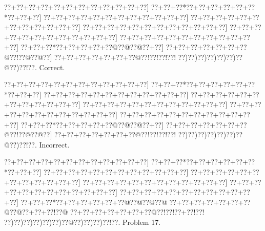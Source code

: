 \documentclass[a5paper]{article}
\begin{document}
\begin{center}
{\goo
\0??+\0??+\0??+\0??+\0??+\0??+\0??+\0??+\0??+\0??+\0??+\0??]
\0??+\0??+\0??*\0??+\0??+\0??+\0??+\0??+\0??*\0??+\0??+\0??]
\0??+\0??+\0??+\0??+\0??+\0??+\0??+\0??+\0??+\0??+\0??+\0??]
\0??+\0??+\0??+\0??+\0??+\0??+\0??+\0??+\0??+\0??+\0??+\0??]
\0??+\0??+\0??+\0??+\0??+\0??+\0??+\0??+\0??+\0??+\0??+\0??]
\0??+\0??+\0??+\0??+\0??+\0??+\0??+\0??+\0??+\0??+\0??+\0??]
\0??+\0??+\0??+\0??+\0??+\0??+\0??+\0??+\0??+\0??+\0??+\0??]
\0??+\0??+\0??*\0??+\0??+\0??+\0??+\0??@\0??@\0??@\0??+\0??]
\0??+\0??+\0??+\0??+\0??+\0??+\0??@\0??!\0??@\0??@\0??]
\0??+\0??+\0??+\0??+\0??+\0??+\0??@\0??!\0??!\0??!\0??!
\0??)\0??)\0??)\0??)\0??)\0??)\0??@\0??)\0??!\0??.
}
Correct. 

\end{center}
\begin{center}
{\goo
\0??+\0??+\0??+\0??+\0??+\0??+\0??+\0??+\0??+\0??+\0??+\0??]
\0??+\0??+\0??*\0??+\0??+\0??+\0??+\0??+\0??*\0??+\0??+\0??]
\0??+\0??+\0??+\0??+\0??+\0??+\0??+\0??+\0??+\0??+\0??+\0??]
\0??+\0??+\0??+\0??+\0??+\0??+\0??+\0??+\0??+\0??+\0??+\0??]
\0??+\0??+\0??+\0??+\0??+\0??+\0??+\0??+\0??+\0??+\0??+\0??]
\0??+\0??+\0??+\0??+\0??+\0??+\0??+\0??+\0??+\0??+\0??+\0??]
\0??+\0??+\0??+\0??+\0??+\0??+\0??+\0??+\0??+\0??+\0??+\0??]
\0??+\0??+\0??*\0??+\0??+\0??+\0??+\0??@\0??@\0??@\0??+\0??]
\0??+\0??+\0??+\0??+\0??+\0??+\0??@\0??!\0??@\0??@\0??]
\0??+\0??+\0??+\0??+\0??+\0??+\0??@\0??!\0??!\0??!\0??!
\0??)\0??)\0??)\0??)\0??)\0??)\0??@\0??)\0??!\0??.
}
Incorrect. 

\end{center}
\newpage
\begin{center}
{\goo
\0??+\0??+\0??+\0??+\0??+\0??+\0??+\0??+\0??+\0??+\0??+\0??]
\0??+\0??+\0??*\0??+\0??+\0??+\0??+\0??+\0??*\0??+\0??+\0??]
\0??+\0??+\0??+\0??+\0??+\0??+\0??+\0??+\0??+\0??+\0??+\0??]
\0??+\0??+\0??+\0??+\0??+\0??+\0??+\0??+\0??+\0??+\0??+\0??]
\0??+\0??+\0??+\0??+\0??+\0??+\0??+\0??+\0??+\0??+\0??+\0??]
\0??+\0??+\0??+\0??+\0??+\0??+\0??+\0??+\0??+\0??+\0??+\0??]
\0??+\0??+\0??+\0??+\0??+\0??+\0??+\0??+\0??+\0??+\0??+\0??]
\0??+\0??+\0??*\0??+\0??+\0??+\0??+\0??+\0??@\0??@\0??@\0??@
\0??+\0??+\0??+\0??+\0??+\0??+\0??@\0??@\0??+\0??+\0??!\0??@
\0??+\0??+\0??+\0??+\0??+\0??+\0??@\0??!\0??!\0??+\0??!\0??!
\0??)\0??)\0??)\0??)\0??)\0??)\0??@\0??)\0??)\0??)\0??!\0??.
}
Problem 17.

\end{center}
\end{document}
